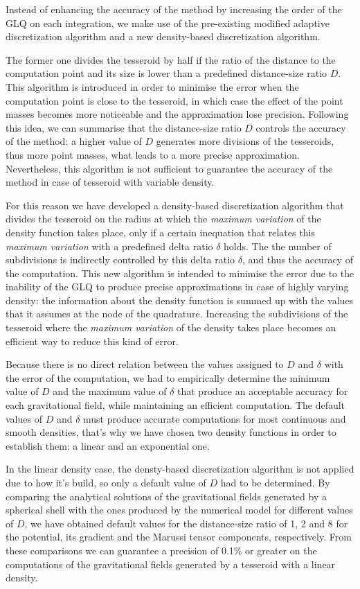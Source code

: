 \documentclass[extra]{gji}
\begin{document}
Instead of enhancing the accuracy of the method by increasing the order of the 
GLQ on each integration, we make use of the pre-existing modified adaptive 
discretization algorithm and a new density-based discretization algorithm.

The former one divides the tesseroid by half if the ratio of the distance to 
the computation point and its size is lower than a predefined distance-size 
ratio $D$.
This algorithm is introduced in order to minimise the error when the 
computation point is close to the tesseroid, in which case the effect of the 
point masses becomes more noticeable and the approximation lose precision.
Following this idea, we can summarise that the distance-size ratio $D$ 
controls the accuracy of the method: a higher value of $D$ generates more 
divisions of the tesseroids, thus more point masses, what leads to a more 
precise approximation.
Nevertheless, this algorithm is not sufficient to guarantee the accuracy of 
the method in case of tesseroid with variable density.

For this reason we have developed a density-based discretization algorithm that 
divides the tesseroid on the radius at which the \emph{maximum variation} of 
the density function takes place, only if a certain inequation that relates 
this \emph{maximum variation} with a predefined delta ratio $\delta$ holds.
The the number of subdivisions is indirectly controlled by this delta 
ratio $\delta$, and thus the accuracy of the computation.
This new algorithm is intended to minimise the error due to the inability of 
the GLQ to produce precise approximations in case of highly varying density: 
the information about the density function is summed up with the values that 
it assumes at the node of the quadrature.
Increasing the subdivisions of the tesseroid where the \emph{maximum 
variation} of the density takes place becomes an efficient way to reduce this 
kind of error.

Because there is no direct relation between the values assigned to $D$ and 
$\delta$ with the error of the computation, we had to empirically determine 
the minimum value of $D$ and the maximum value of $\delta$ that produce an 
acceptable accuracy for each gravitational field, while maintaining an 
efficient computation.
The default values of $D$ and $\delta$ must produce accurate computations for 
most continuous and smooth densities, that's why we have chosen two density 
functions in order to establish them: a linear and an exponential one.

In the linear density case, the densty-based discretization algorithm is not 
applied due to how it's build, so only a default value of $D$ had to be 
determined.
By comparing the analytical solutions of the gravitational fields generated by 
a spherical shell with the ones produced by the numerical model for different 
values of $D$, we have obtained default values for the distance-size ratio of 
1, 2 and 8 for the potential, its gradient and the Marussi tensor components, 
respectively.
From these comparisons we can guarantee a precision of 0.1\% or greater on the 
computations of the gravitational fields generated by a tesseroid with a 
linear density.
\end{document}
